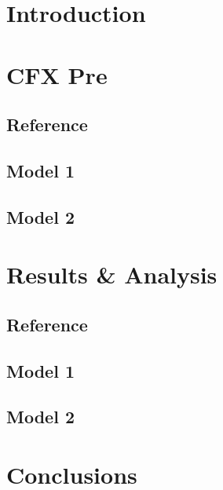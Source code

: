 \chapter{Introduction}
\label{ch:intro}


\chapter{CFX Pre}
\label{ch:pre}

\section{Reference}
\label{sec:pre_ref}


\section{Model 1}
\label{sec:pre_mod1}


\section{Model 2}
\label{sec:pre_mod2}


\chapter{Results \& Analysis}
\label{ch:res}

\section{Reference}
\label{sec:res_ref}


\section{Model 1}
\label{sec:res_mod1}


\section{Model 2}
\label{sec:res_mod2}


\chapter{Conclusions}
\label{ch:conc}
